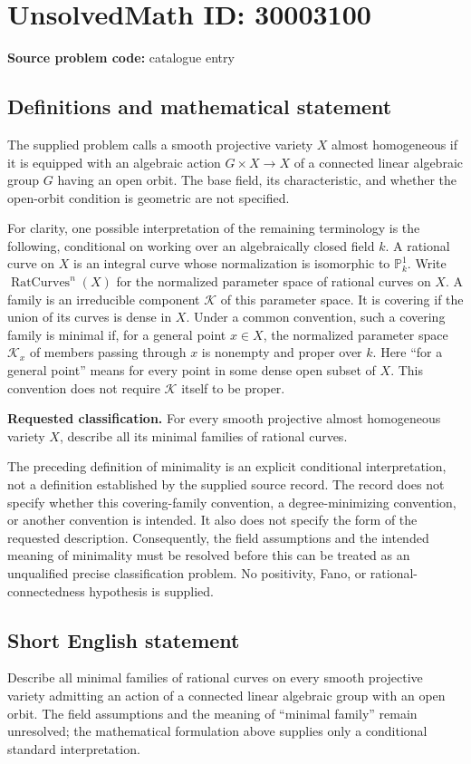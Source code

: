 \documentclass[11pt]{article}
\newcommand{\PP}{\mathbb{P}}
\begin{document}
\section*{UnsolvedMath ID: 30003100}
\textbf{Source problem code:} catalogue entry
\subsection{Definitions and mathematical statement}
The supplied problem calls a smooth projective variety \(X\) almost homogeneous if it is equipped with an algebraic action \(G\times X\to X\) of a connected linear algebraic group \(G\) having an open orbit. The base field, its characteristic, and whether the open-orbit condition is geometric are not specified.

For clarity, one possible interpretation of the remaining terminology is the following, conditional on working over an algebraically closed field \(k\). A rational curve on \(X\) is an integral curve whose normalization is isomorphic to \(\PP^1_k\). Write \(\operatorname{RatCurves}^{n}(X)\) for the normalized parameter space of rational curves on \(X\). A family is an irreducible component \(\mathcal K\) of this parameter space. It is covering if the union of its curves is dense in \(X\). Under a common convention, such a covering family is minimal if, for a general point \(x\in X\), the normalized parameter space \(\mathcal K_x\) of members passing through \(x\) is nonempty and proper over \(k\). Here ``for a general point'' means for every point in some dense open subset of \(X\). This convention does not require \(\mathcal K\) itself to be proper.

\textbf{Requested classification.} For every smooth projective almost homogeneous variety \(X\), describe all its minimal families of rational curves.

The preceding definition of minimality is an explicit conditional interpretation, not a definition established by the supplied source record. The record does not specify whether this covering-family convention, a degree-minimizing convention, or another convention is intended. It also does not specify the form of the requested description. Consequently, the field assumptions and the intended meaning of minimality must be resolved before this can be treated as an unqualified precise classification problem. No positivity, Fano, or rational-connectedness hypothesis is supplied.
\subsection{Short English statement}
Describe all minimal families of rational curves on every smooth projective variety admitting an action of a connected linear algebraic group with an open orbit. The field assumptions and the meaning of ``minimal family'' remain unresolved; the mathematical formulation above supplies only a conditional standard interpretation.
\end{document}
